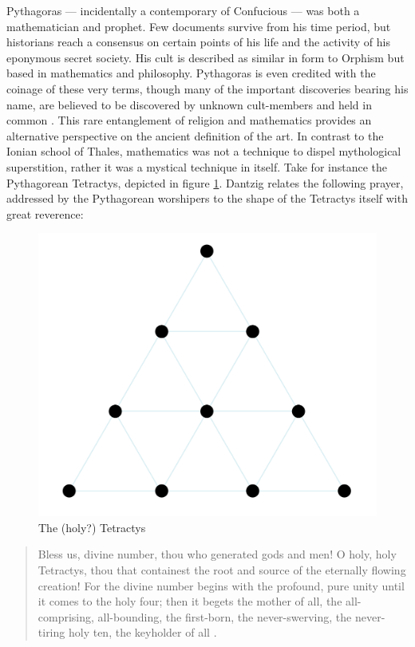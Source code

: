 \documentclass[12pt]{article}
\begin{document}
Pythagoras ---
incidentally a contemporary of Confucious ---
was both a mathematician and prophet.
Few documents survive from his time period,
but historians reach a consensus on certain points
of his life and the activity
of his eponymous secret society.
His cult is described as similar in form to Orphism
but based in mathematics and philosophy.
Pythagoras is even credited with
the coinage of these very terms,
though many of the important discoveries
bearing his name,
are believed to be discovered by
unknown cult-members and held in common \cite{boyer1991}.
This rare entanglement of religion and mathematics
provides an alternative perspective on
the ancient definition of the art.
In contrast to the Ionian school of Thales,
mathematics was not a technique
to dispel mythological superstition,
rather it was a mystical technique in itself.
Take for instance the Pythagorean Tetractys,
depicted in figure \ref{fig3}.
Dantzig relates the following prayer,
addressed by the Pythagorean worshipers
to the shape of the Tetractys itself
with great reverence:


\begin{figure}
	\includegraphics[scale=0.1]{tetractys.png}
	\centering
	\caption{The (holy?) Tetractys \cite{tetractys}}
	\label{fig3}
\end{figure}

\begin{quote}

	Bless us, divine number, thou who generated gods and men! O holy, holy Tetractys, thou that containest the root and source of the eternally flowing creation! For the divine number begins with the profound, pure unity until it comes to the holy four; then it begets the mother of all, the all-comprising, all-bounding, the first-born, the never-swerving, the never-tiring holy ten, the keyholder of all \cite{dantzig}.

\end{quote}
\end{document}

